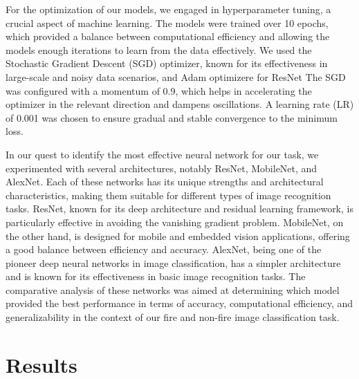 For the optimization of our models, we engaged in hyperparameter tuning, a crucial aspect of machine learning. The models were trained over 10 epochs, which provided a balance between computational efficiency and allowing the models enough iterations to learn from the data effectively. We used the Stochastic Gradient Descent (SGD) optimizer, known for its effectiveness in large-scale and noisy data scenarios, and Adam optimizere for ResNet The SGD was configured with a momentum of 0.9, which helps in accelerating the optimizer in the relevant direction and dampens oscillations. A learning rate (LR) of 0.001 was chosen to ensure gradual and stable convergence to the minimum loss.

In our quest to identify the most effective neural network for our task, we experimented with several architectures, notably ResNet, MobileNet, and AlexNet. Each of these networks has its unique strengths and architectural characteristics, making them suitable for different types of image recognition tasks. ResNet, known for its deep architecture and residual learning framework, is particularly effective in avoiding the vanishing gradient problem. MobileNet, on the other hand, is designed for mobile and embedded vision applications, offering a good balance between efficiency and accuracy. AlexNet, being one of the pioneer deep neural networks in image classification, has a simpler architecture and is known for its effectiveness in basic image recognition tasks. The comparative analysis of these networks was aimed at determining which model provided the best performance in terms of accuracy, computational efficiency, and generalizability in the context of our fire and non-fire image classification task.

\section{Results}


